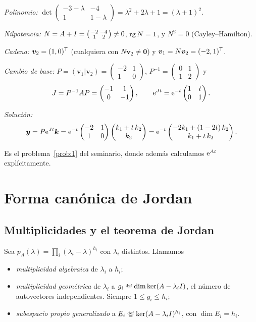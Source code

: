 \documentclass[11pt,twoside]{article}
\newcommand\vy{\bm{y}}
\newcommand\vv{\bm{v}}
\newcommand\vk{\bm{k}}
\newcommand\mat[1]{\begin{pmatrix}#1\end{pmatrix}}
\newcommand\smat[1]{\left(\begin{smallmatrix}#1\end{smallmatrix}\right)}
\begin{document}
\begin{ejemplo}[raíz doble no diagonalizable, $A=\smat{-3&-4\\1&1}$]\label{ej:4-1}
\begin{pasos}
\item \emph{Polinomio:} $\det\smat{-3-\lambda&-4\\1&1-\lambda}=\lambda^2+2\lambda+1=(\lambda+1)^2$.
\item \emph{Nilpotencia:} $N=A+\Id=\smat{-2&-4\\1&2}\neq0$, $\operatorname{rg} N=1$, y $N^2=0$ (Cayley--Hamilton).
\item \emph{Cadena:} $\vv_2=(1,0)\T$ (cualquiera con $N\vv_2\neq\bm0$) y $\vv_1=N\vv_2=(-2,1)\T$.
\item \emph{Cambio de base:} $P=(\vv_1|\vv_2)=\smat{-2&1\\1&0}$, $P^{-1}=\smat{0&1\\1&2}$ y
\begin{equation*}
J=P^{-1}AP=\mat{-1&1\\0&-1},\qquad
\e^{Jt}=\e^{-t}\mat{1&t\\0&1}.
\end{equation*}
\item \emph{Solución:}
\begin{equation*}
\vy=P\e^{Jt}\vk=\e^{-t}\mat{-2&1\\1&0}\mat{k_1+t\,k_2\\k_2}=\e^{-t}\mat{-2k_1+(1-2t)\,k_2\\ k_1+t\,k_2}.
\end{equation*}
\end{pasos}
Es el problema~\ref{prob:1} del seminario, donde además calculamos $\mathrm{e}^{At}$ explícitamente.
\end{ejemplo}

\section{Forma canónica de Jordan}\label{sec:jordan}

\subsection{Multiplicidades y el teorema de Jordan}

\begin{definicion}[Multiplicidades]\label{def:multiplicidades}
Sea $p_A(\lambda)=\prod_i(\lambda_i-\lambda)^{h_i}$ con $\lambda_i$ distintos. Llamamos
\begin{itemize}
\item \emph{multiplicidad algebraica} de $\lambda_i$ a $h_i$;
\item \emph{multiplicidad geométrica} de $\lambda_i$ a $g_i\defeq\dim\ker(A-\lambda_i\Id)$, el número de autovectores
independientes. Siempre $1\le g_i\le h_i$;
\item \emph{subespacio propio generalizado} a $E_i\defeq\ker(A-\lambda_i\Id)^{h_i}$, con $\dim E_i=h_i$.
\end{itemize}
\end{definicion}
\end{document}
